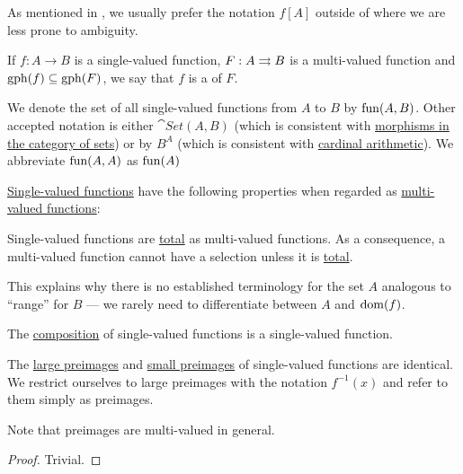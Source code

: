 \begin{definition}
\begin{thmenum}
    As mentioned in , we usually prefer the notation \( f[A] \) outside of  where we are less prone to ambiguity.

     If \( f: A \to B \) is a single-valued function, \( F: A \rightrightarrows B \) is a multi-valued function and \( \operatorname{gph}(f) \subseteq \operatorname{gph}(F) \), we say that \( f \) is a  of \( F \).

     We denote the set of all single-valued functions from \( A \) to \( B \) by \( \operatorname{fun}(A, B) \). Other accepted notation is either \( \cat{Set}(A, B) \) (which is consistent with \hyperref[def:category_of_sets]{morphisms in the category of sets}) or by \( B^A \) (which is consistent with \hyperref[def:cardinal_arithmetic]{cardinal arithmetic}). We abbreviate \( \operatorname{fun}(A, A) \) as \( \operatorname{fun}(A) \)
  \end{thmenum}
\end{definition}

\begin{proposition}\label{thm:function_properties}
  \hyperref[def:function]{Single-valued functions} have the following properties when regarded as \hyperref[def:multi_valued_function]{multi-valued functions}:
  \begin{thmenum}
     Single-valued functions are \hyperref[def:multi_valued_function/total]{total} as multi-valued functions. As a consequence, a multi-valued function cannot have a selection unless it is \hyperref[def:multi_valued_function/total]{total}.

    This explains why there is no established terminology for the set \( A \) analogous to \enquote{range} for \( B \) --- we rarely need to differentiate between \( A \) and \( \operatorname{dom}(f) \).

     The \hyperref[def:multi_valued_function/composition]{composition} of single-valued functions is a single-valued function.

     The \hyperref[def:multi_valued_function/large_preimage]{large preimages} and \hyperref[def:multi_valued_function/small_preimage]{small preimages} of single-valued functions are identical. We restrict ourselves to large preimages with the notation \( f^{-1}(x) \) and refer to them simply as preimages.

    Note that preimages are multi-valued in general.
  \end{thmenum}
\end{proposition}
\begin{proof}
  Trivial.
\end{proof}

